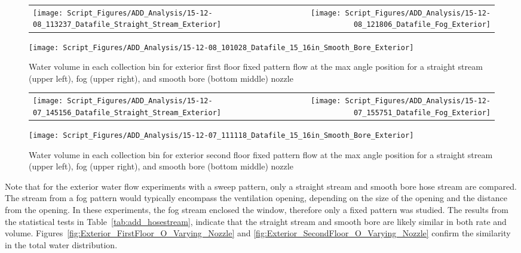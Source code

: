 \documentclass{article}
\begin{document}
\begin{figure}[ht]
\begin{tabular*}{\textwidth}{lr}
\texttt{[image: Script\_Figures/ADD\_Analysis/15-12-08\_113237\_Datafile\_Straight\_Stream\_Exterior]} &
\texttt{[image: Script\_Figures/ADD\_Analysis/15-12-08\_121806\_Datafile\_Fog\_Exterior]} \\
\end{tabular*}
\centering
\texttt{[image: Script\_Figures/ADD\_Analysis/15-12-08\_101028\_Datafile\_15\_16in\_Smooth\_Bore\_Exterior]}
\caption{Water volume in each collection bin for exterior first floor fixed pattern flow at the max angle position for a straight stream (upper left), fog (upper right), and smooth bore (bottom middle) nozzle}
\label{fig:Exterior_FirstFloor_Fixed_Varying_Nozzle}
\end{figure}

\begin{figure}[ht]
\begin{tabular*}{\textwidth}{lr}
\texttt{[image: Script\_Figures/ADD\_Analysis/15-12-07\_145156\_Datafile\_Straight\_Stream\_Exterior]} &
\texttt{[image: Script\_Figures/ADD\_Analysis/15-12-07\_155751\_Datafile\_Fog\_Exterior]} \\
\end{tabular*}
\centering
\texttt{[image: Script\_Figures/ADD\_Analysis/15-12-07\_111118\_Datafile\_15\_16in\_Smooth\_Bore\_Exterior]}
\caption{Water volume in each collection bin for exterior second floor fixed pattern flow at the max angle position for a straight stream (upper left), fog (upper right), and smooth bore (bottom middle) nozzle}
\label{fig:Exterior_SecondFloor_Fixed_Varying_Nozzle}
\end{figure}

\clearpage

Note that for the exterior water flow experiments with a sweep pattern, only a straight stream and smooth bore hose stream are compared. The stream from a fog pattern would typically encompass the ventilation opening, depending on the size of the opening and the distance from the opening. In these experiments, the fog stream enclosed the window, therefore only a fixed pattern was studied. The results from the statistical tests in Table~\ref{tab:add_hosestream}, indicate that the straight stream and smooth bore are likely similar in both rate and volume. Figures~\ref{fig:Exterior_FirstFloor_O_Varying_Nozzle} and \ref{fig:Exterior_SecondFloor_O_Varying_Nozzle} confirm the similarity in the total water distribution.
\end{document}

